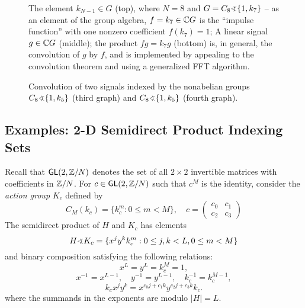 \begin{figure}
\centerline{}
\caption{The element $k_{N-1} \in G$ (top), where $N=8$ and $G = C_{8}\sdp \{1,k_7\}$ -- as an element of the group
  algebra, $f =  k_7 \in \mathbb{C} G$ is the ``impulse 
    function'' with one nonzero coefficient $f(k_7) =1$; 
    A linear signal $g\in \mathbb{C} G$ (middle); the product $fg = k_7g$ (bottom) is,
    in general, the convolution of $g$ by $f$, and is implemented
    by appealing to the convolution theorem and using a 
    generalized FFT algorithm.}
\label{fig:k7conv}
\end{figure}

\begin{figure}
\centerline{}
\caption{Convolution of two signals indexed by the nonabelian
  groups $C_{8}\sdp \{1,k_5\}$ (third graph) and 
  $C_{8}\sdp \{1,k_5\}$ (fourth graph).}
\label{fig:k5_k3_conv}
\end{figure}


\subsection{Examples: 2-D Semidirect Product Indexing Sets}%
\begin{example}
Recall that $\mathsf{GL}(2,\mathbb{Z}/N)$ denotes the set of all $2\times 2$ invertible
matrices with coefficients in $\mathbb{Z}/N$.  
For $c\in \mathsf{GL}(2,\mathbb{Z}/N)$ such that $c^M$ is the identity,
consider the \emph{action group} $K_c$ defined by
\[
C_M(k_c) = \{k_c^m : 0 \leq m < M\}, \quad
c = \begin{pmatrix} c_0 & c_1 \\ c_2 & c_3 \end{pmatrix}
\]
The semidirect product of $H$ and $K_c$ has elements
\[
H\varangle K_c = \{x^j y^k k_c^m : 0 \leq j,k < L, 0 \leq m< M\}
\]
and binary composition satisfying the following relations:
\[
x^L = y^L = k_c^M = 1,
\]
\[
x^{-1} = x^{L-1}, \quad y^{-1}= y^{L-1}, \quad k_c^{-1} = k_c^{M-1},
\]
\[
k_c x^j y^k = x^{c_0 j + c_1 k} y^{c_2 j + c_3 k} k_c.
\]
where the summands in the exponents are modulo $|H|=L$.
\end{example}

